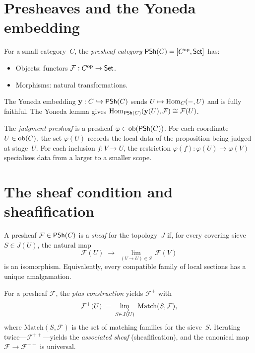\section{Presheaves and the Yoneda embedding}

\begin{definition}
For a small category~$C$, the \emph{presheaf category}
$\mathsf{PSh}(C) = [C^{\mathrm{op}}, \mathsf{Set}]$ has:
\begin{itemize}[nosep]
\item Objects: functors $\mathcal{F} : C^{\mathrm{op}} \to \mathsf{Set}$.
\item Morphisms: natural transformations.
\end{itemize}
\end{definition}

The Yoneda embedding $\mathbf{y} : C \hookrightarrow \mathsf{PSh}(C)$ sends
$U \mapsto \mathrm{Hom}_C(-,U)$ and is fully faithful.  The Yoneda lemma gives
$\mathrm{Hom}_{\mathsf{PSh}(C)}(\mathbf{y}(U), \mathcal{F}) \cong \mathcal{F}(U)$.

\begin{definition}
\label{def:phi}
The \emph{judgment presheaf} is a presheaf
$\varphi \in \mathrm{ob}(\mathsf{PSh}(C))$.  For each coordinate
$U \in \mathrm{ob}(C)$, the set $\varphi(U)$ records the local data of
the proposition being judged at stage~$U$.  For each inclusion
$f : V \to U$, the restriction $\varphi(f) : \varphi(U) \to
\varphi(V)$ specialises data from a larger to a smaller scope.
\end{definition}

\section{The sheaf condition and sheafification}
\label{sec:sheafification}

\begin{definition}[Sheaf]
A presheaf $\mathcal{F} \in \mathsf{PSh}(C)$ is a \emph{sheaf} for the
topology~$J$ if, for every covering sieve $S \in J(U)$, the natural
map
\[
  \mathcal{F}(U) \;\longrightarrow\;
  \lim_{(V \to U) \in S}\, \mathcal{F}(V)
\]
is an isomorphism.  Equivalently, every compatible family of local
sections has a unique amalgamation.
\end{definition}

\begin{construction}
\label{con:plus}
For a presheaf $\mathcal{F}$, the \emph{plus construction} yields
$\mathcal{F}^+$ with
\[
  \mathcal{F}^+(U) \;=\;
  \varinjlim_{S \in J(U)}\;
  \mathrm{Match}(S, \mathcal{F}),
\]
where $\mathrm{Match}(S,\mathcal{F})$ is the set of matching families
for the sieve~$S$.  Iterating twice---$\mathcal{F}^{++}$---yields the
\emph{associated sheaf} (sheafification), and the canonical map
$\mathcal{F} \to \mathcal{F}^{++}$ is universal.
\end{construction}


